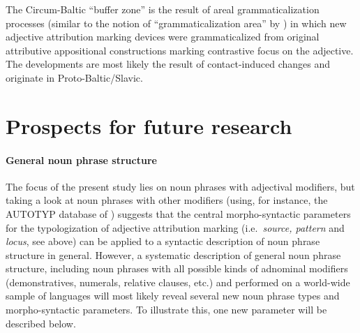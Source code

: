 The Circum-Baltic “buffer zone” is the result of areal grammaticalization processes (similar to the notion of “grammaticalization area” by \cite{heine-etal2005}) in which new adjective attribution marking devices were grammaticalized from original attributive appositional constructions marking contrastive focus on the adjective. The developments are most likely the result of contact-induced changes and originate in Proto\hyp{}Baltic\slash{}Slavic.

\section{Prospects for future research}
\paragraph*{General noun phrase structure} The focus of the present study lies on noun phrases with adjectival modifiers, but taking a look at noun phrases with other modifiers (using, for instance, the AUTOTYP database of \citealt{AUTOTYP-NP}) suggests that the central morpho-syntactic parameters for the typologization of adjective attribution marking (i.e.~\textit{source, pattern} and \textit{locus}, see above) can be applied to a syntactic description of noun phrase structure in general. However, a systematic description of general noun phrase structure, including noun phrases with all possible kinds of adnominal modifiers (demonstratives, numerals, relative clauses, etc.) and performed on a world-wide sample of languages will most likely reveal several new noun phrase types and morpho-syntactic parameters. To illustrate this, one new parameter will be described below.   

